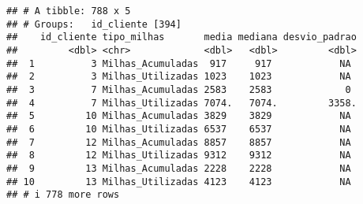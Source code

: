 \documentclass[
]{article}
\begin{document}
\begin{verbatim}
## # A tibble: 788 x 5
## # Groups:   id_cliente [394]
##    id_cliente tipo_milhas       media mediana desvio_padrao
##         <dbl> <chr>             <dbl>   <dbl>         <dbl>
##  1          3 Milhas_Acumuladas  917     917            NA 
##  2          3 Milhas_Utilizadas 1023    1023            NA 
##  3          7 Milhas_Acumuladas 2583    2583             0 
##  4          7 Milhas_Utilizadas 7074.   7074.         3358.
##  5         10 Milhas_Acumuladas 3829    3829            NA 
##  6         10 Milhas_Utilizadas 6537    6537            NA 
##  7         12 Milhas_Acumuladas 8857    8857            NA 
##  8         12 Milhas_Utilizadas 9312    9312            NA 
##  9         13 Milhas_Acumuladas 2228    2228            NA 
## 10         13 Milhas_Utilizadas 4123    4123            NA 
## # i 778 more rows
\end{verbatim}
\end{document}
